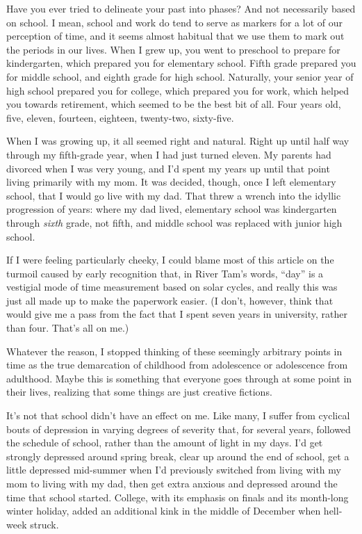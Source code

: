 Have you ever tried to delineate your past into phases? And not
necessarily based on school. I mean, school and work do tend to serve as
markers for a lot of our perception of time, and it seems almost
habitual that we use them to mark out the periods in our lives. When I
grew up, you went to preschool to prepare for kindergarten, which
prepared you for elementary school. Fifth grade prepared you for middle
school, and eighth grade for high school. Naturally, your senior year of
high school prepared you for college, which prepared you for work, which
helped you towards retirement, which seemed to be the best bit of all.
Four years old, five, eleven, fourteen, eighteen, twenty-two,
sixty-five.

When I was growing up, it all seemed right and natural. Right up until
half way through my fifth-grade year, when I had just turned eleven. My
parents had divorced when I was very young, and I'd spent my years up
until that point living primarily with my mom. It was decided, though,
once I left elementary school, that I would go live with my dad. That
threw a wrench into the idyllic progression of years: where my dad
lived, elementary school was kindergarten through \emph{sixth} grade,
not fifth, and middle school was replaced with junior high school.

If I were feeling particularly cheeky, I could blame most of this
article on the turmoil caused by early recognition that, in River Tam's
words, ``day'' is a vestigial mode of time measurement based on solar
cycles, and really this was just all made up to make the paperwork
easier. (I don't, however, think that would give me a pass from the fact
that I spent seven years in university, rather than four. That's all on
me.)

Whatever the reason, I stopped thinking of these seemingly arbitrary
points in time as the true demarcation of childhood from adolescence or
adolescence from adulthood. Maybe this is something that everyone goes
through at some point in their lives, realizing that some things are
just creative fictions.

It's not that school didn't have an effect on me. Like many, I suffer
from cyclical bouts of depression in varying degrees of severity that,
for several years, followed the schedule of school, rather than the
amount of light in my days. I'd get strongly depressed around spring
break, clear up around the end of school, get a little depressed
mid-summer when I'd previously switched from living with my mom to
living with my dad, then get extra anxious and depressed around the time
that school started. College, with its emphasis on finals and its
month-long winter holiday, added an additional kink in the middle of
December when hell-week struck.

